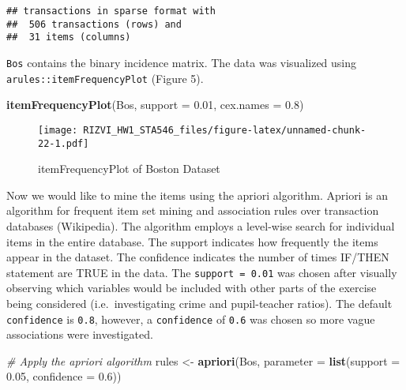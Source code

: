 \documentclass[]{article}
\newenvironment{Shaded}{\begin{snugshade}}{\end{snugshade}}
\newcommand{\KeywordTok}[1]{\textcolor[rgb]{0.13,0.29,0.53}{\textbf{{#1}}}}
\newcommand{\DataTypeTok}[1]{\textcolor[rgb]{0.13,0.29,0.53}{{#1}}}
\newcommand{\FloatTok}[1]{\textcolor[rgb]{0.00,0.00,0.81}{{#1}}}
\newcommand{\StringTok}[1]{\textcolor[rgb]{0.31,0.60,0.02}{{#1}}}
\newcommand{\CommentTok}[1]{\textcolor[rgb]{0.56,0.35,0.01}{\textit{{#1}}}}
\newcommand{\NormalTok}[1]{{#1}}
\begin{document}
\begin{verbatim}
## transactions in sparse format with
##  506 transactions (rows) and
##  31 items (columns)
\end{verbatim}

\texttt{Bos} contains the binary incidence matrix. The data was
visualized using \texttt{arules::itemFrequencyPlot} (Figure 5).

\begin{Shaded}
\begin{Highlighting}[]
\KeywordTok{itemFrequencyPlot}\NormalTok{(Bos, }\DataTypeTok{support =} \FloatTok{0.01}\NormalTok{, }\DataTypeTok{cex.names =} \FloatTok{0.8}\NormalTok{)}
\end{Highlighting}
\end{Shaded}

\begin{figure}[htbp]
\centering
\texttt{[image: RIZVI\_HW1\_STA546\_files/figure-latex/unnamed-chunk-22-1.pdf]}
\caption{itemFrequencyPlot of Boston Dataset}
\end{figure}

Now we would like to mine the items using the apriori algorithm. Apriori
is an algorithm for frequent item set mining and association rules over
transaction databases (Wikipedia). The algorithm employs a level-wise
search for individual items in the entire database. The support
indicates how frequently the items appear in the dataset. The confidence
indicates the number of times IF/THEN statement are TRUE in the data.
The \texttt{support = 0.01} was chosen after visually observing which
variables would be included with other parts of the exercise being
considered (i.e.~investigating crime and pupil-teacher ratios). The
default \texttt{confidence} is \texttt{0.8}, however, a
\texttt{confidence} of \texttt{0.6} was chosen so more vague
associations were investigated.

\begin{Shaded}
\begin{Highlighting}[]
\CommentTok{# Apply the apriori algorithm}
\NormalTok{rules  <-}\StringTok{ }\KeywordTok{apriori}\NormalTok{(Bos, }\DataTypeTok{parameter =} \KeywordTok{list}\NormalTok{(}\DataTypeTok{support =} \FloatTok{0.05}\NormalTok{, }\DataTypeTok{confidence =} \FloatTok{0.6}\NormalTok{))}
\end{Highlighting}
\end{Shaded}
\end{document}
